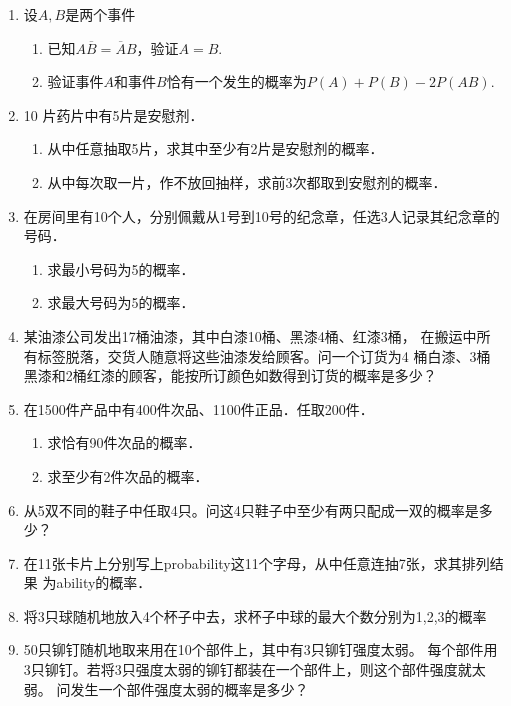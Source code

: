\documentclass[10pt,a4paper]{article}
\begin{document}
\begin{enumerate}
    \item 设$A,B$是两个事件
    \begin{enumerate}
        \item 已知$A\overline{B}=\overline{A}B$，验证$A=B$.
        \item 验证事件$A$和事件$B$恰有一个发生的概率为$P(A)+P(B)-2P(AB)$.
    \end{enumerate}


    \item 10 片药片中有5片是安慰剂．
    \begin{enumerate}
        \item 从中任意抽取5片，求其中至少有2片是安慰剂的概率．
        \item 从中每次取一片，作不放回抽样，求前3次都取到安慰剂的概率．
    \end{enumerate}


    \item 在房间里有10个人，分别佩戴从1号到10号的纪念章，任选3人记录其纪念章的号码．
    \begin{enumerate}
        \item 求最小号码为5的概率．
        \item 求最大号码为5的概率．
    \end{enumerate}


    \item 某油漆公司发出17桶油漆，其中白漆10桶、黑漆4桶、红漆3桶，
    在搬运中所有标签脱落，交货人随意将这些油漆发给顾客。问一个订货为4
    桶白漆、3桶黑漆和2桶红漆的顾客，能按所订颜色如数得到订货的概率是多少？

    
    \item 在1500件产品中有400件次品、1100件正品．任取200件．
    \begin{enumerate}
        \item 求恰有90件次品的概率．
        \item 求至少有2件次品的概率．
    \end{enumerate}


    \item 从5双不同的鞋子中任取4只。问这4只鞋子中至少有两只配成一双的概率是多少？
    

    \item 在11张卡片上分别写上probability这11个字母，从中任意连抽7张，求其排列结果
    为ability的概率．


    \item 将3只球随机地放入4个杯子中去，求杯子中球的最大个数分别为1,2,3的概率
    

    \item 50只铆钉随机地取来用在10个部件上，其中有3只铆钉强度太弱。
    每个部件用3只铆钉。若将3只强度太弱的铆钉都装在一个部件上，则这个部件强度就太弱。
    问发生一个部件强度太弱的概率是多少？



\end{enumerate}
\end{document}
